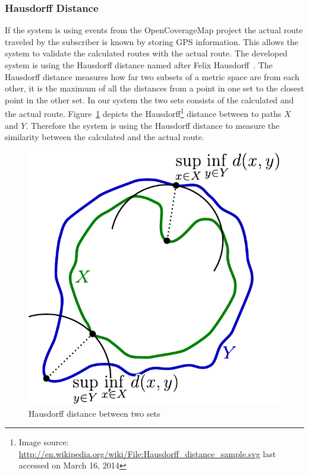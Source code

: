 \subsubsection{Hausdorff Distance}
If the system is using events from the OpenCoverageMap project the actual route traveled by the subscriber is known by storing GPS information. This allows the system to validate the calculated routes with the actual route. The developed system is using the Hausdorff distance named after Felix Hausdorff~\cite{Rockafellar1998}. The Hausdorff distance measures how far two subsets of a metric space are from each other, it is the maximum of all the distances from a point in one set to the closest point in the other set. In our system the two sets consists of the calculated and the actual route. Figure~\ref{fig:Hausdorff_distance_sample} depicts the Hausdorff\footnote{Image source: \url{http://en.wikipedia.org/wiki/File:Hausdorff_distance_sample.svg} last accessed on March 16, 2014 } distance between to paths $X$ and $Y$. Therefore the system is using the Hausdorff distance to measure the similarity between the calculated and the actual route.
\begin{figure}
	\centering
	\includegraphics[width=0.7\linewidth]{./images/Hausdorff_distance_sample}
	\caption{Hausdorff distance between two sets}
	\label{fig:Hausdorff_distance_sample}
\end{figure}

